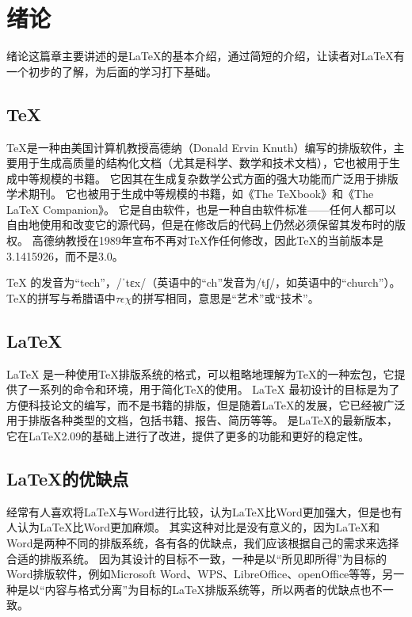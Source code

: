 \section{绪论}
绪论这篇章主要讲述的是\LaTeX{}的基本介绍，通过简短的介绍，让读者对\LaTeX{}有一个初步的了解，为后面的学习打下基础。
\subsection{\TeX{}}
\TeX{}是一种由美国计算机教授高德纳（Donald Ervin Knuth）编写的排版软件，主要用于生成高质量的结构化文档（尤其是科学、数学和技术文档），它也被用于生成中等规模的书籍。
它因其在生成复杂数学公式方面的强大功能而广泛用于排版学术期刊。
它也被用于生成中等规模的书籍，如《The \TeX{}book》和《The \LaTeX{} Companion》。
它是自由软件，也是一种自由软件标准——任何人都可以自由地使用和改变它的源代码，但是在修改后的代码上仍然必须保留其发布时的版权。
高德纳教授在1989年宣布不再对\TeX{}作任何修改，因此\TeX{}的当前版本是3.1415926，而不是3.0。

\TeX{} 的发音为“tech”，/ˈtɛx/（英语中的“ch”发音为/tʃ/，如英语中的“church”）。\TeX{}的拼写与希腊语中$\tau\epsilon\chi$的拼写相同，意思是“艺术”或“技术”。

\subsection{\LaTeX{}}
\LaTeX{} 是一种使用\TeX{}排版系统的格式，可以粗略地理解为\TeX{}的一种宏包，它提供了一系列的命令和环境，用于简化\TeX{}的使用。
\LaTeX{} 最初设计的目标是为了方便科技论文的编写，而不是书籍的排版，但是随着\LaTeX{}的发展，它已经被广泛用于排版各种类型的文档，包括书籍、报告、简历等等。
\LaTeXe{} 是\LaTeX{}的最新版本，它在\LaTeX{}2.09的基础上进行了改进，提供了更多的功能和更好的稳定性。

\subsection{\LaTeX{}的优缺点}
经常有人喜欢将\LaTeX{}与Word进行比较，认为\LaTeX{}比Word更加强大，但是也有人认为\LaTeX{}比Word更加麻烦。
其实这种对比是没有意义的，因为\LaTeX{}和Word是两种不同的排版系统，各有各的优缺点，我们应该根据自己的需求来选择合适的排版系统。
因为其设计的目标不一致，一种是以“所见即所得”为目标的Word排版软件，例如Microsoft Word、WPS、LibreOffice、openOffice等等，另一种是以“内容与格式分离”为目标的\LaTeX{}排版系统等，所以两者的优缺点也不一致。

